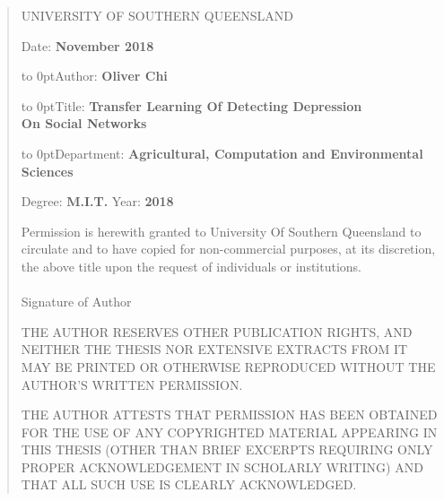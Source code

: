 \documentclass[12pt]{article}
\def\author{Oliver Chi}
\def\degreeinitial{M.I.T.}
\def\title{Transfer Learning Of Detecting Depression \\
       On Social Networks}
\def\university{University Of Southern Queensland}
\def\dept{Agricultural, Computation and Environmental Sciences}
\def\submitdate{November 2018}
\def\copyrightyear{2018}
\begin{document}
	\newpage \parindent=0.75in 
	\begin{quotation}
	\begin{center}
		\large \uppercase\expandafter{\university}
	\end{center}
	\bigskip
	\begin{flushright}
		Date: {\bf\submitdate}
	\end{flushright}
	\begin{list}{}{
		\setlength{\leftmargin}{1in}
		\setlength{\labelwidth}{0pt}
		\setlength{\labelsep}{\leftmargin}}
	\raggedright
	\item[\hbox to 0pt{Author:}]      {\bf\author} 
	\item[\hbox to 0pt{Title:}]       {\bf\title} 
	\item[\hbox to 0pt{Department:}]  {\bf\dept}
	\end{list}
	Degree: {\bf\degreeinitial\hfil} 
		Year: {\bf\copyrightyear\hfil} \\
	\bigskip
	\def\baselinestretch{1}\normalsize
	\parindent=36pt

	\indent
	{\small Permission is herewith granted to \university
	to circulate and to have copied for non-commercial purposes, at its 
	discretion, the above title upon the request of individuals or
	institutions.}

	\vskip1.5in
	\paragraph{}{{\hspace{8cm} \small Signature of Author}}

	\bigskip\bigskip

	\begin{sloppypar}
	\footnotesize
	\relax
	THE AUTHOR RESERVES OTHER PUBLICATION RIGHTS, AND NEITHER 
	THE THESIS NOR EXTENSIVE EXTRACTS FROM IT MAY BE PRINTED OR 
	OTHERWISE REPRODUCED WITHOUT THE AUTHOR'S WRITTEN PERMISSION.
	\medskip

	THE AUTHOR ATTESTS THAT PERMISSION HAS BEEN OBTAINED FOR THE
	USE OF ANY COPYRIGHTED MATERIAL APPEARING IN THIS THESIS (OTHER 
	THAN BRIEF EXCERPTS REQUIRING ONLY PROPER ACKNOWLEDGEMENT IN 
	SCHOLARLY WRITING) AND THAT ALL SUCH USE IS CLEARLY ACKNOWLEDGED.
	\end{sloppypar}
	\end{quotation}
	
	\setcounter{page}{1}
	\pagebreak

\renewcommand*\contentsname{Table Of Contents}
\tableofcontents
\goodbreak
\newpage
\end{document}
